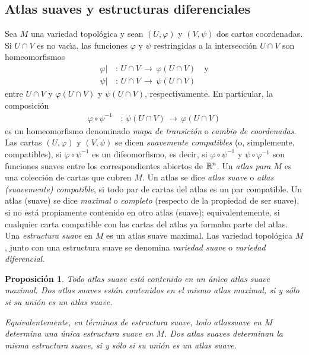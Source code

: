 \theoremstyle{plain}
\newtheorem{propoAtlasMax}{Proposici\'{o}n}[section]
\newtheorem{lemaDeLasBolasRegulares}[propoAtlasMax]{Lema}
\newtheorem{lemaDeLasCartas}[propoAtlasMax]{Lema}

\theoremstyle{remark}
\newtheorem{remarkAtlasMax}{Observaci\'{o}n}[section]


\subsection{Atlas suaves y estructuras diferenciales}
Sea $M$ una variedad topol\'{o}gica y sean $(U,\varphi)$ y $(V,\psi)$ dos
cartas coordenadas. Si $U\cap V$ es no vac\'{\i}a, las funciones
$\varphi$ y $\psi$ restringidas a la intersecci\'{o}n $U\cap V$ son
homeomorfismos
\begin{align*}
	\varphi| & \,:\,U\cap V\,\rightarrow\,\varphi(U\cap V)\quad\text{y} \\
	\psi| & \,:\, U\cap V\,\rightarrow\,\psi(U\cap V)
\end{align*}
%
entre $U\cap V$ y $\varphi(U\cap V)$ y $\psi(U\cap V)$, respectivamente. En
particular, la composici\'{o}n
\begin{align*}
	\varphi\circ\psi^{-1} & \,:\,\psi(U\cap V)\,\rightarrow\,
		\varphi(U\cap V)
\end{align*}
%
es un homeomorfismo denominado \emph{mapa de transici\'{o}n} o \emph{cambio %
de coordenadas}. Las cartas $(U,\varphi)$ y $(V,\psi)$ se dicen
\emph{suavemente compatibles} (o, simplemente, compatibles), si
$\varphi\circ\psi^{-1}$ es un difeomorfismo, es decir, si
$\varphi\circ\psi^{-1}$ y $\psi\circ\varphi^{-1}$ son funciones suaves
entre los correspondientes abiertos de $\mathbb{R}^{n}$. Un \emph{atlas para $M$}
es una colecci\'{o}n de cartas que cubren $M$. Un atlas se dice
\emph{atlas suave} o \emph{atlas (suavemente) compatible}, si todo par
de cartas del atlas es un par compatible. Un atlas (suave) se dice
\emph{maximal} o \emph{completo} (respecto de la propiedad de ser suave),
si no est\'{a} propiamente contenido en otro atlas (suave); equivalentemente,
si cualquier carta compatible con las cartas del atlas ya formaba parte del
atlas. Una \emph{estructura suave} en $M$ es un atlas suave maximal. Las
variedad topol\'{o}gica $M$, junto con una estructura suave se denomina
\emph{variedad suave} o \emph{variedad diferencial}.

\begin{propoAtlasMax}\label{thm:atlasmax}
	Todo atlas suave est\'{a} contenido en un \'{u}nico atlas suave
	maximal. Dos atlas suaves est\'{a}n contenidos en el mismo atlas
	maximal, si y s\'{o}lo si su uni\'{o}n es un atlas suave.

	Equivalentemente, en t\'{e}rminos de estructura suave, todo
	atlassuave en $M$ determina una \'{u}nica estructura suave en $M$.
	Dos atlas suaves determinan la misma estructura suave, si y s\'{o}lo
	si su uni\'{o}n es un atlas suave.
\end{propoAtlasMax}

